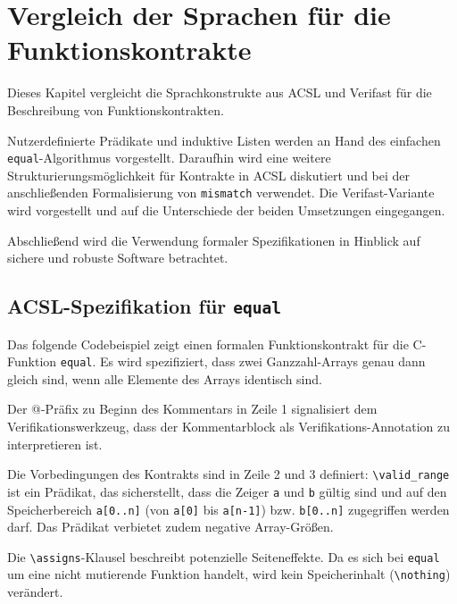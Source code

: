 ﻿\chapter{Vergleich der Sprachen für die Funktionskontrakte}
\label{sec:design-by-contract}

Dieses Kapitel vergleicht die Sprachkonstrukte aus ACSL und Verifast für die Beschreibung von Funktionskontrakten.

Nutzerdefinierte Prädikate und induktive Listen werden an Hand des einfachen \texttt{equal}-Algorithmus vorgestellt.
Daraufhin wird eine weitere Strukturierungsmöglichkeit für Kontrakte in ACSL diskutiert und bei der anschließenden
Formalisierung von \texttt{mismatch} verwendet. Die Verifast-Variante wird vorgestellt und auf die Unterschiede
der beiden Umsetzungen eingegangen. 

Abschließend wird die Verwendung formaler Spezifikationen in Hinblick auf sichere und robuste Software betrachtet.


\section{ACSL-Spezifikation für \texttt{equal}}
\label{sec:design-by-contract:acsl-spezifikation}

Das folgende Codebeispiel zeigt einen formalen Funktionskontrakt für die C-Funktion \texttt{equal}. Es wird
spezifiziert, dass zwei Ganzzahl-Arrays genau dann gleich sind, wenn alle Elemente des Arrays identisch sind.



Der @-Präfix zu Beginn des Kommentars in Zeile 1 signalisiert dem Verifikationswerkzeug, 
dass der Kommentarblock als Verifikations-Annotation zu interpretieren ist. 

Die Vorbedingungen des Kontrakts sind in Zeile 2 und 3 definiert: \lstinline{\valid_range} ist ein Prädikat, das sicherstellt,
dass die Zeiger \lstinline{a} und \lstinline{b} gültig sind und auf den Speicherbereich \lstinline{a[0..n]} 
(von \lstinline{a[0]} bis \lstinline{a[n-1]}) bzw. \lstinline{b[0..n]} zugegriffen 
werden darf. Das Prädikat verbietet zudem negative Array-Größen.

Die \lstinline{\assigns}-Klausel beschreibt potenzielle Seiteneffekte. Da es sich bei \texttt{equal} um eine nicht mutierende
Funktion handelt, wird kein Speicherinhalt (\lstinline{\nothing}) verändert.

